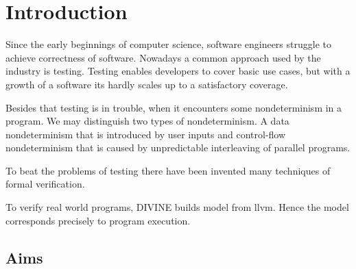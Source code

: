 \chapter{Introduction}\label{ch:Introduction}


\noindent
Since the early beginnings of computer science, software engineers struggle to
achieve correctness of software. Nowadays a common approach used by the industry
is testing. Testing enables developers to cover basic use cases, but with a
growth of a software its hardly scales up to a satisfactory coverage.

Besides that testing is in trouble, when it encounters some nondeterminism in a
program. We may distinguish two types of nondeterminism. A data nondeterminism
that is introduced by user inputs and control-flow nondeterminism that is caused
by unpredictable interleaving of parallel programs.

To beat the problems of testing there have been invented many techniques of
formal verification.



 To verify real world programs, DIVINE builds
model from llvm. Hence the model corresponds precisely to program execution.

\section{Aims}




